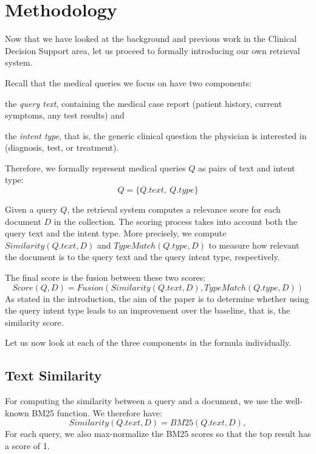 \chapter{Methodology}

Now that we have looked at the background and previous work in the Clinical Decision Support area,
let us proceed to formally introducing our own retrieval system. 

Recall that the medical queries we focus on have two components:
\begin{enumerate*}[label=\arabic*)]
 \item the \emph{query text}, containing the medical case report (patient history, current symptoms, any test results) and
 \item the \emph{intent type}, that is, the generic clinical question the physician is interested in (diagnosis, test, or treatment).
\end{enumerate*}
Therefore, we formally represent medical queries $Q$ as pairs of text and intent type: \[Q = \{Q.text,\ Q.type\}\]

Given a query $Q$, the retrieval system computes a relevance score for each document $D$ in the collection.
The scoring process takes into account both the query text and the intent type. More precisely, we compute
$Similarity(Q.text, D)$ and $TypeMatch(Q.type, D)$ to measure how relevant the document is to the query text and the
query intent type, respectively.

The final score is the fusion between these two scores:
\[
 Score(Q, D) = Fusion\left(Similarity(Q.text, D), TypeMatch(Q.type, D)\right)
\]
As stated in the introduction, the aim of the paper is to determine whether using the query intent type leads to an improvement
over the baseline, that is, the similarity score.

Let us now look at each of the three components in the formula individually.

\section{Text Similarity}
For computing the similarity between a query and a document, we use the well-known BM25 function. We therefore have:
\[
Similarity(Q.text, D) = BM25(Q.text,D),%
\]
For each query, we also max-normalize the BM25 scores so that the top result has a score of 1.


